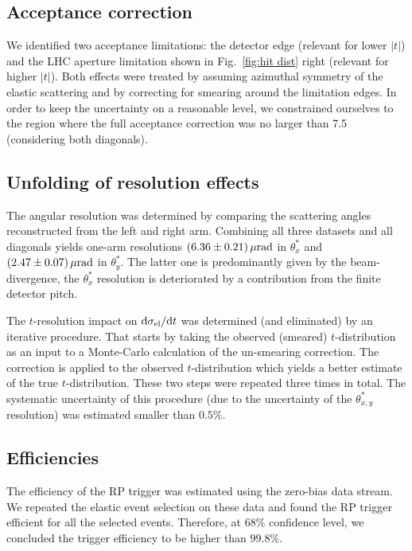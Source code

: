 \documentclass[doublecol]{../macros/epl2}
\def\d{{\rm d}}
\def\un#1{\,{\rm #1}}
\begin{document}
\subsection{Acceptance correction}

We identified two acceptance limitations: the detector edge (relevant for lower $|t|$) and the LHC aperture limitation shown in Fig.~\ref{fig:hit dist} right (relevant for higher $|t|$). Both effects were treated by assuming azimuthal symmetry of the elastic scattering and by correcting for smearing around the limitation edges. In order to keep the uncertainty on a reasonable level, we constrained ourselves to the region where the full acceptance correction was no larger than 7.5 (considering both diagonals).


\subsection{Unfolding of resolution effects}

The angular resolution was determined by comparing the scattering angles reconstructed from the left and right arm. Combining all three datasets and all diagonals yields one-arm resolutions $(6.36\pm 0.21)\un{\mu rad}$ in $\theta^*_x$ and $(2.47\pm 0.07)\un{\mu rad}$ in $\theta^*_y$. The latter one is predominantly given by the beam-divergence, the $\theta^*_x$ resolution is deteriorated by a contribution from the finite detector pitch.

The $t$-resolution impact on $\d\sigma_{\rm el}/\d t$  was determined (and eliminated) by an iterative procedure. That starts by taking the observed (smeared) $t$-distribution as an input to a Monte-Carlo calculation of the un-smearing correction. The correction is applied to the observed $t$-distribution which yields a better estimate of the true $t$-distribution. These two steps were repeated three times in total. The systematic uncertainty of this procedure (due to the uncertainty of the $\theta^*_{x, y}$ resolution) was estimated smaller than $0.5\%$.

\subsection{Efficiencies}

The efficiency of the RP trigger was estimated using the zero-bias data stream. We repeated the elastic event selection on these data and found the RP trigger efficient for all the selected events. Therefore, at $68\%$ confidence level, we concluded the trigger efficiency to be higher than $99.8\%$.
\end{document}
